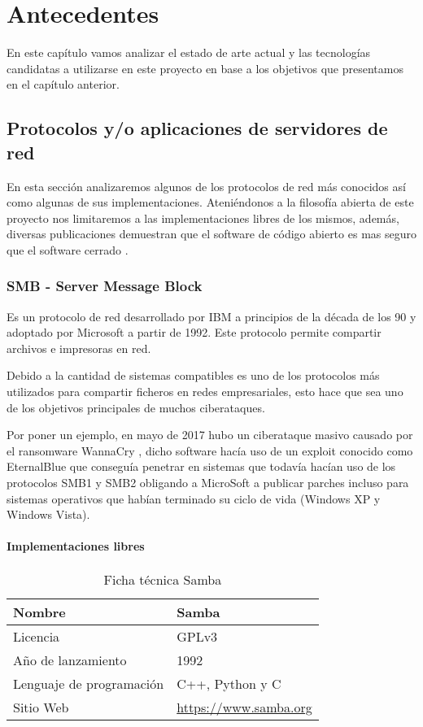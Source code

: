 \chapter{Antecedentes}

En este capítulo vamos analizar el estado de arte actual y las tecnologías candidatas a utilizarse en este proyecto en base a los objetivos que presentamos en el capítulo anterior.

\section {Protocolos y/o aplicaciones de servidores de red}

En esta sección analizaremos algunos de los protocolos de red más conocidos así como algunas de sus implementaciones. Ateniéndonos a la filosofía abierta de este proyecto nos limitaremos a las implementaciones libres de los mismos, además, diversas publicaciones demuestran que el software de código abierto es mas seguro que el software cerrado \cite{clark_is_2009}.

\subsection {SMB - Server Message Block}

Es un protocolo de red desarrollado por IBM a principios de la década de los 90 y adoptado por Microsoft a partir de 1992. Este protocolo permite compartir archivos e impresoras en red.

\bigskip
Debido a la cantidad de sistemas compatibles es uno de los protocolos más utilizados para compartir ficheros en redes empresariales, esto hace que sea uno de los objetivos principales de muchos ciberataques.

\bigskip
Por poner un ejemplo, en mayo de 2017 hubo un ciberataque masivo causado por el ransomware WannaCry \cite{sarabia_mayor_2017}, dicho software hacía uso de un exploit conocido como EternalBlue que conseguía penetrar en sistemas que todavía hacían uso de los protocolos SMB1 y SMB2 obligando a MicroSoft a publicar parches incluso para sistemas operativos que habían terminado su ciclo de vida (Windows XP y Windows Vista).


\subsubsection {Implementaciones libres}

\begin{table}[H]
\begin{tabular}{|l|l|}
\hline
Nombre                   & Samba                        \\ \hline
Licencia                 & GPLv3                        \\ \hline
Año de lanzamiento       & 1992                         \\ \hline
Lenguaje de programación & C++, Python y C              \\ \hline
Sitio Web                & \url{https://www.samba.org} 	\\ \hline
\end{tabular}
\caption{Ficha técnica Samba}
\end{table}

